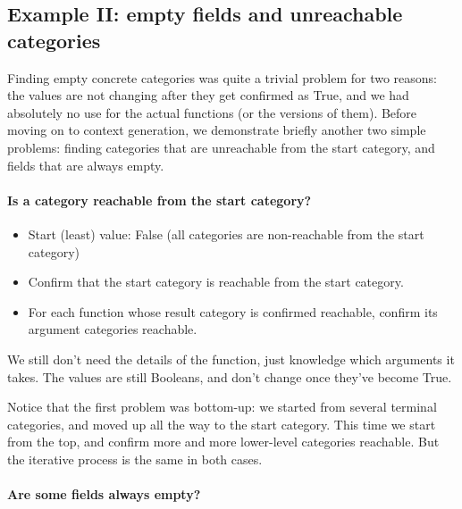 \subsection{Example II: empty fields and unreachable categories}

Finding empty concrete categories was quite a trivial problem for two
reasons: the values are not changing after they get confirmed as True,
and we had absolutely no use for the actual \gf{} functions (or the
\pmcfg{} versions of them).  Before moving on to context generation,
we demonstrate briefly another two simple problems: finding categories
that are unreachable from the start category, and fields that are
always empty.

\paragraph{Is a category reachable from the start category?}

\begin{itemize}
\item Start (least) value: False (all categories are non-reachable from the start category)
\item Confirm that the start category is reachable from the start category.
\item For each function whose result category is confirmed reachable, confirm its argument categories reachable.
\end{itemize}

We still don’t need the details of the function, just knowledge which arguments it takes. The values are still Booleans, and don’t change once they’ve become True.

Notice that the first problem was bottom-up: we started from several terminal categories, and moved up all the way to the start category. This time we start from the top, and confirm more and more lower-level categories reachable. But the iterative process is the same in both cases.

\paragraph{Are some fields always empty?}


